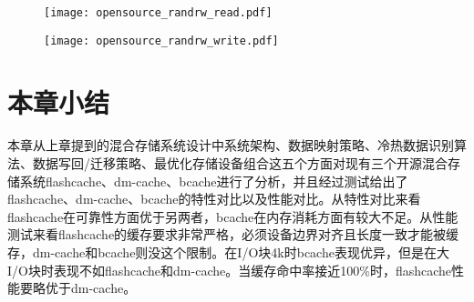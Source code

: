 \begin{figure}[H]
    \centering
    \texttt{[image: opensource\_randrw\_read.pdf]}
\end{figure}

\begin{figure}[H]
    \centering
    \texttt{[image: opensource\_randrw\_write.pdf]}
\end{figure}

\section{本章小结}

本章从上章提到的混合存储系统设计中系统架构、数据映射策略、冷热数据识别算法、数据写回/迁移策略、最优化存储设备组合这五个方面对现有三个开源混合存储系统flashcache、dm-cache、bcache进行了分析，并且经过测试给出了flashcache、dm-cache、bcache的特性对比以及性能对比。从特性对比来看flashcache在可靠性方面优于另两者，bcache在内存消耗方面有较大不足。从性能测试来看flashcache的缓存要求非常严格，必须设备边界对齐且长度一致才能被缓存，dm-cache和bcache则没这个限制。在I/O块4k时bcache表现优异，但是在大I/O块时表现不如flashcache和dm-cache。当缓存命中率接近100\%时，flashcache性能要略优于dm-cache。